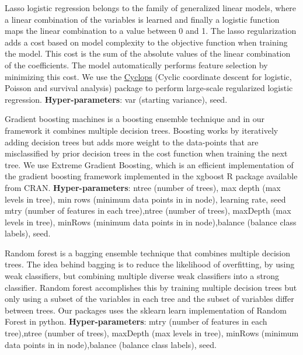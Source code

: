 \documentclass[]{book}
\providecommand{\tightlist}{%
  \setlength{\itemsep}{0pt}\setlength{\parskip}{0pt}}
\begin{document}
\begin{description}
\tightlist
\item[Regularized Logistic Regression]
Lasso logistic regression belongs to the family of generalized linear
models, where a linear combination of the variables is learned and
finally a logistic function maps the linear combination to a value
between 0 and 1. The lasso regularization adds a cost based on model
complexity to the objective function when training the model. This cost
is the sum of the absolute values of the linear combination of the
coefficients. The model automatically performs feature selection by
minimizing this cost. We use the
\href{https://ohdsi.github.io/Cyclops/}{Cyclops} (Cyclic coordinate
descent for logistic, Poisson and survival analysis) package to perform
large-scale regularized logistic regression. \textbf{Hyper-parameters}:
var (starting variance), seed.
\item[Gradient boosting machines]
Gradient boosting machines is a boosting ensemble technique and in our
framework it combines multiple decision trees. Boosting works by
iteratively adding decision trees but adds more weight to the
data-points that are misclassified by prior decision trees in the cost
function when training the next tree. We use Extreme Gradient Boosting,
which is an efficient implementation of the gradient boosting framework
implemented in the xgboost R package available from CRAN.
\textbf{Hyper-parameters}: ntree (number of trees), max depth (max
levels in tree), min rows (minimum data points in in node), learning
rate, seed \textbar{} mtry (number of features in each tree),ntree
(number of trees), maxDepth (max levels in tree), minRows (minimum data
points in in node),balance (balance class labels), seed.
\item[Random forest]
Random forest is a bagging ensemble technique that combines multiple
decision trees. The idea behind bagging is to reduce the likelihood of
overfitting, by using weak classifiers, but combining multiple diverse
weak classifiers into a strong classifier. Random forest accomplishes
this by training multiple decision trees but only using a subset of the
variables in each tree and the subset of variables differ between trees.
Our packages uses the sklearn learn implementation of Random Forest in
python. \textbf{Hyper-parameters}: mtry (number of features in each
tree),ntree (number of trees), maxDepth (max levels in tree), minRows
(minimum data points in in node),balance (balance class labels), seed.
\item[K-nearest neighbors]

\end{description}
\end{document}
